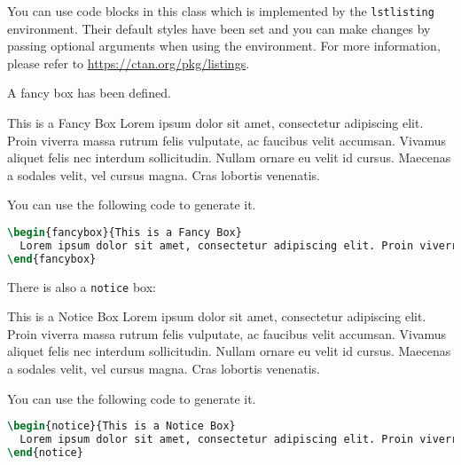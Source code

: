 \documentclass[oneside]{seu-ml-assign}
\begin{document}
     You can use code blocks in this class which is implemented by the \texttt{lstlisting} environment.
    Their default styles have been set and you can make changes by passing optional arguments when using the environment.
    For more information, please refer to \url{https://ctan.org/pkg/listings}.

     A fancy box has been defined.
      \begin{fancybox}{This is a Fancy Box}
        Lorem ipsum dolor sit amet, consectetur adipiscing elit. Proin viverra massa rutrum felis vulputate, ac faucibus velit accumsan. Vivamus aliquet felis nec interdum sollicitudin. Nullam ornare eu velit id cursus. Maecenas a sodales velit, vel cursus magna. Cras lobortis venenatis.
      \end{fancybox}

    You can use the following code to generate it.
    \begin{lstlisting}[language=tex,numbers=none,morekeywords={begin}]
\begin{fancybox}{This is a Fancy Box}
  Lorem ipsum dolor sit amet, consectetur adipiscing elit. Proin viverra massa rutrum felis vulputate, ac faucibus velit accumsan. Vivamus aliquet felis nec interdum sollicitudin. Nullam ornare eu velit id cursus. Maecenas a sodales velit, vel cursus magna. Cras lobortis venenatis.
\end{fancybox}
    \end{lstlisting}

    There is also a \texttt{notice} box:
    \begin{notice}{This is a Notice Box}
      Lorem ipsum dolor sit amet, consectetur adipiscing elit. Proin viverra massa rutrum felis vulputate, ac faucibus velit accumsan. Vivamus aliquet felis nec interdum sollicitudin. Nullam ornare eu velit id cursus. Maecenas a sodales velit, vel cursus magna. Cras lobortis venenatis.
    \end{notice}

    You can use the following code to generate it.
    \begin{lstlisting}[language=tex,numbers=none,morekeywords={begin}]
\begin{notice}{This is a Notice Box}
  Lorem ipsum dolor sit amet, consectetur adipiscing elit. Proin viverra massa rutrum felis vulputate, ac faucibus velit accumsan. Vivamus aliquet felis nec interdum sollicitudin. Nullam ornare eu velit id cursus. Maecenas a sodales velit, vel cursus magna. Cras lobortis venenatis.
\end{notice}
    \end{lstlisting}
\end{document}
